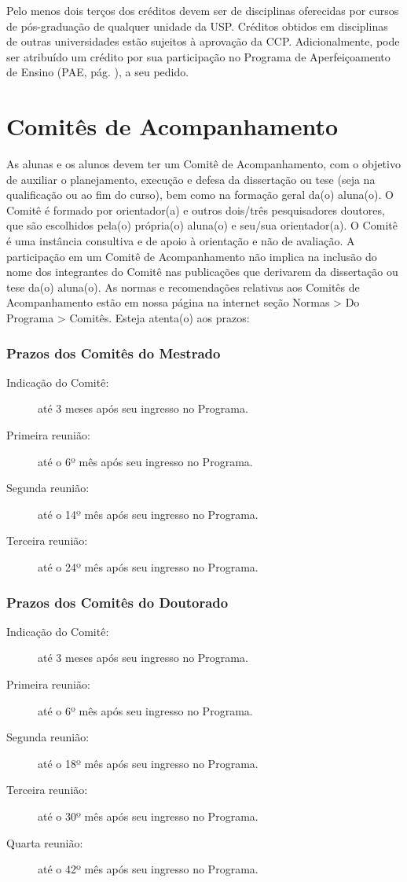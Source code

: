 \documentclass[twoside a4paper 12pt]{report}
\begin{document}
Pelo menos dois terços dos créditos devem ser de disciplinas
oferecidas por cursos de pós-graduação de qualquer unidade da
USP. Créditos obtidos em disciplinas de outras universidades estão
sujeitos à aprovação da CCP. Adicionalmente, pode ser atribuído um 
crédito por sua participação no Programa de Aperfeiçoamento de Ensino
(PAE, pág. \pageref{subsec:pae}), a seu pedido.


\section{Comitês de Acompanhamento}
\label{sec:comites}

As alunas e os alunos devem ter um Comitê de Acompanhamento, com o
objetivo de auxiliar o planejamento, execução e defesa da dissertação
ou tese (seja na qualificação ou ao fim do curso), bem como na
formação geral da(o) aluna(o). O Comitê é formado por orientador(a) e
outros dois/três pesquisadores doutores, que são escolhidos pela(o)
própria(o) aluna(o) e seu/sua orientador(a). O Comitê é uma instância
consultiva e de apoio à orientação e não de avaliação. A participação
em um Comitê de Acompanhamento não implica na inclusão do nome dos
integrantes do Comitê nas publicações que derivarem da dissertação ou
tese da(o) aluna(o). As normas e recomendações relativas aos Comitês
de Acompanhamento estão em nossa página na internet seção Normas
\textgreater{} Do Programa \textgreater{} Comitês. Esteja atenta(o)
aos prazos:

\subsubsection{Prazos dos Comitês do Mestrado}
\begin{description}
\item[Indicação do Comitê:] até 3 meses após seu ingresso no Programa.
\item[Primeira reunião:] até o 6º mês após seu ingresso no Programa.
\item[Segunda reunião:] até  o 14º mês após seu ingresso no Programa.
\item[Terceira reunião:] até  o 24º mês após seu ingresso no Programa.
\end{description}

\subsubsection{Prazos dos Comitês do Doutorado}
\begin{description}
\item[Indicação do Comitê:] até 3 meses após seu ingresso no Programa.
\item[Primeira reunião:] até o 6º mês após seu ingresso no Programa.
\item[Segunda reunião:] até  o 18º mês após seu ingresso no Programa.
\item[Terceira reunião:] até  o 30º mês após seu ingresso no Programa.
\item[Quarta reunião:] até  o 42º mês após seu ingresso no Programa.
\end{description}
\end{document}
